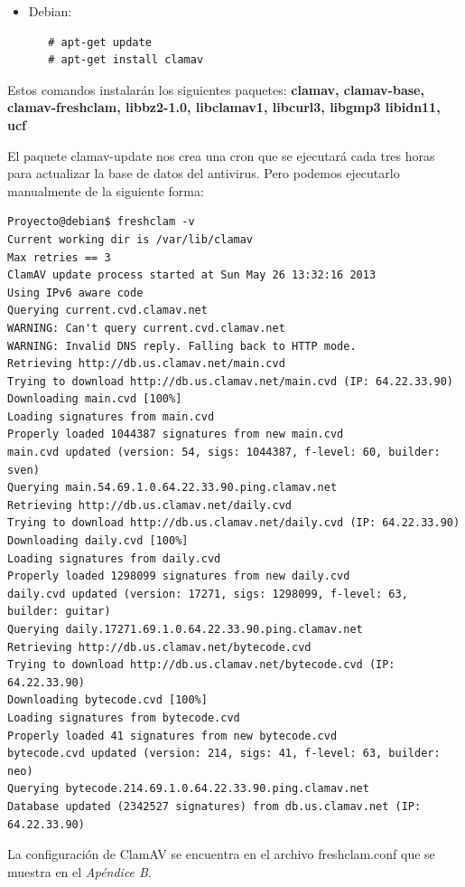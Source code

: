 \begin{itemize}
 \item Debian:
  \begin{verbatim}
   # apt-get update
   # apt-get install clamav
  \end{verbatim}

\end{itemize}

Estos comandos instalar\'an los siguientes paquetes: \textbf{clamav, 
clamav-base, clamav-freshclam, libbz2-1.0, libclamav1, libcurl3, libgmp3 
libidn11, ucf}

El paquete clamav-update nos crea una cron que se ejecutará cada tres horas para 
actualizar la base de datos del antivirus. Pero podemos ejecutarlo manualmente 
de la siguiente forma:

\begin{verbatim}
Proyecto@debian$ freshclam -v
Current working dir is /var/lib/clamav
Max retries == 3
ClamAV update process started at Sun May 26 13:32:16 2013
Using IPv6 aware code
Querying current.cvd.clamav.net
WARNING: Can't query current.cvd.clamav.net
WARNING: Invalid DNS reply. Falling back to HTTP mode.
Retrieving http://db.us.clamav.net/main.cvd
Trying to download http://db.us.clamav.net/main.cvd (IP: 64.22.33.90)
Downloading main.cvd [100%]
Loading signatures from main.cvd
Properly loaded 1044387 signatures from new main.cvd
main.cvd updated (version: 54, sigs: 1044387, f-level: 60, builder: sven)
Querying main.54.69.1.0.64.22.33.90.ping.clamav.net
Retrieving http://db.us.clamav.net/daily.cvd
Trying to download http://db.us.clamav.net/daily.cvd (IP: 64.22.33.90)
Downloading daily.cvd [100%]
Loading signatures from daily.cvd
Properly loaded 1298099 signatures from new daily.cvd
daily.cvd updated (version: 17271, sigs: 1298099, f-level: 63, builder: guitar)
Querying daily.17271.69.1.0.64.22.33.90.ping.clamav.net
Retrieving http://db.us.clamav.net/bytecode.cvd
Trying to download http://db.us.clamav.net/bytecode.cvd (IP: 64.22.33.90)
Downloading bytecode.cvd [100%]
Loading signatures from bytecode.cvd
Properly loaded 41 signatures from new bytecode.cvd
bytecode.cvd updated (version: 214, sigs: 41, f-level: 63, builder: neo)
Querying bytecode.214.69.1.0.64.22.33.90.ping.clamav.net
Database updated (2342527 signatures) from db.us.clamav.net (IP: 64.22.33.90)

\end{verbatim}

La configuraci\'on de ClamAV se encuentra en el archivo freshclam.conf que se 
muestra en  el \emph{Apéndice B}.

